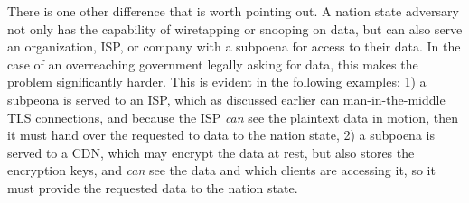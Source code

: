 There is one other difference that is worth pointing out.  A nation state adversary not only has the capability of wiretapping or snooping on data, but can also serve an organization, ISP, or company with a subpoena for access to their data.  In the case of an overreaching government legally asking for data, this makes the problem significantly harder.  This is evident in the following examples: 1) a subpeona is served to an ISP, which as discussed earlier can man-in-the-middle TLS connections, and because the ISP {\it can} see the plaintext data in motion, then it must hand over the requested to data to the nation state, 2) a subpoena is served to a CDN, which may encrypt the data at rest, but also stores the encryption keys, and {\it can} see the data and which clients are accessing it, so it must provide the requested data to the nation state.  
